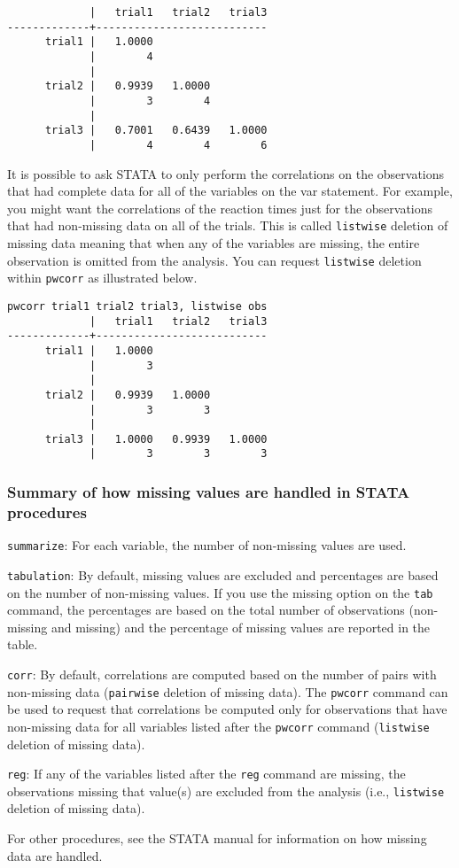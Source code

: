 \begin{lstlisting}
             |   trial1   trial2   trial3
-------------+---------------------------
      trial1 |   1.0000
             |        4
             |
      trial2 |   0.9939   1.0000
             |        3        4
             |
      trial3 |   0.7001   0.6439   1.0000
             |        4        4        6
\end{lstlisting}

It is possible to ask STATA to only perform the correlations on the observations that had complete data for all of the variables on the var statement. For example, you might want the correlations of the reaction times just for the observations that had non-missing data on all of the trials. This is called \lstinline{listwise} deletion of missing data meaning that when any of the variables are missing, the entire observation is omitted from the analysis. You can request \lstinline{listwise} deletion within \lstinline{pwcorr} as illustrated below.

\begin{lstlisting}
pwcorr trial1 trial2 trial3, listwise obs
             |   trial1   trial2   trial3
-------------+---------------------------
      trial1 |   1.0000
             |        3
             |
      trial2 |   0.9939   1.0000
             |        3        3
             |
      trial3 |   1.0000   0.9939   1.0000
             |        3        3        3
\end{lstlisting}

\subsubsection{Summary of how missing values are handled in STATA procedures}

\begin{compactitem}
\item \lstinline{summarize}: For each variable, the number of non-missing values are used.
\item \lstinline{tabulation}: By default, missing values are excluded and percentages are based on the number of non-missing values. If you use the missing option on the \lstinline{tab} command, the percentages are based on the total number of observations (non-missing and missing) and the percentage of missing values are reported in the table.
\item \lstinline{corr}: By default, correlations are computed based on the number of pairs with non-missing data (\lstinline{pairwise} deletion of missing data). The \lstinline{pwcorr} command can be used to request that correlations be computed only for observations that have non-missing data for all variables listed after the \lstinline{pwcorr} command (\lstinline{listwise} deletion of missing data).
\item \lstinline{reg}: If any of the variables listed after the \lstinline{reg} command are missing, the observations missing that value(s) are excluded from the analysis (i.e., \lstinline{listwise} deletion of missing data).
\item For other procedures, see the STATA manual for information on how missing data are handled.
\end{compactitem}


